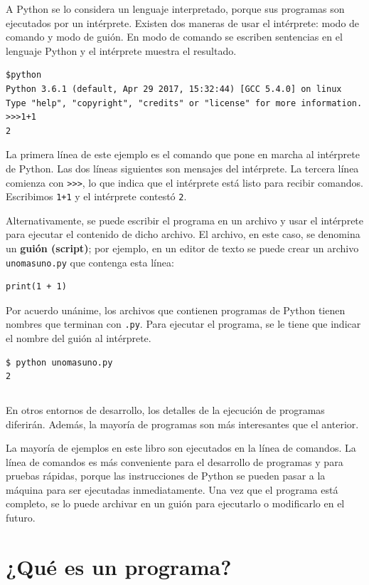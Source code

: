 A Python se lo considera un lenguaje interpretado, porque sus programas
son ejecutados por un intérprete. Existen dos maneras de usar el intérprete:
modo de comando y modo de guión. En modo de comando se escriben sentencias
en el lenguaje Python y el intérprete muestra el resultado.
\begin{verbatim}
$python
Python 3.6.1 (default, Apr 29 2017, 15:32:44) [GCC 5.4.0] on linux 
Type "help", "copyright", "credits" or "license" for more information. 
>>>1+1
2
\end{verbatim}
La primera línea de este ejemplo es el comando que pone en marcha
al intérprete de Python. Las dos líneas siguientes son mensajes del
intérprete. La tercera línea comienza con {\verb+>>>+}, lo que
indica que el intérprete está listo para recibir comandos. Escribimos
\texttt{1+1} y el intérprete contestó \texttt{2}.

Alternativamente, se puede escribir el programa en un archivo y usar
el intérprete para ejecutar el contenido de dicho archivo. El archivo,
en este caso, se denomina un \textbf{guión (script)}; por ejemplo,
en un editor de texto se puede crear un archivo \texttt{unomasuno.py}
que contenga esta línea:

\begin{verbatim}
print(1 + 1)
\end{verbatim}

Por acuerdo unánime, los archivos que contienen programas de Python
tienen nombres que terminan con \texttt{.py}. Para ejecutar el programa,
se le tiene que indicar el nombre del guión al intérprete.

\begin{verbatim}
$ python unomasuno.py
2
\end{verbatim}
\begin{verbatim}

\end{verbatim}
En otros entornos de desarrollo, los detalles de la ejecución de programas
diferirán. Además, la mayoría de programas son más interesantes que
el anterior.

La mayoría de ejemplos en este libro son ejecutados en la línea de
comandos. La línea de comandos es más conveniente para el desarrollo
de programas y para pruebas rápidas, porque las instrucciones de Python
se pueden pasar a la máquina para ser ejecutadas inmediatamente. Una
vez que el programa está completo, se lo puede archivar en un guión
para ejecutarlo o modificarlo en el futuro.

\section{¿Qué es un programa?}

